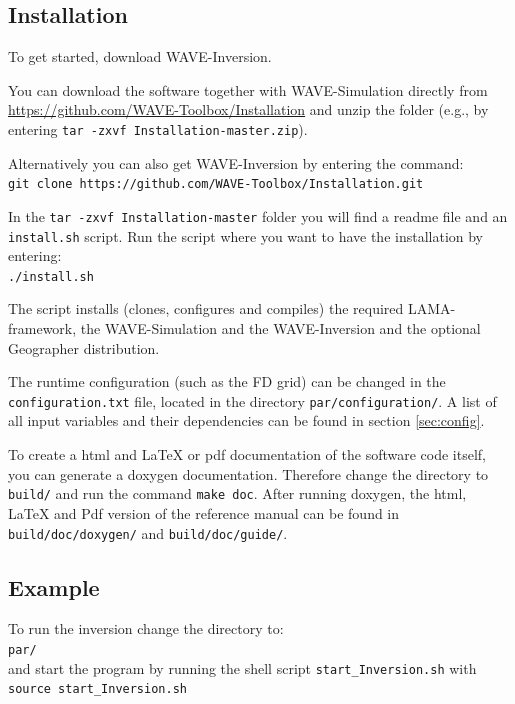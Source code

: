 \documentclass[pdftex,a4paper,parskip,listof=totoc,bibliography=totoc,onehalfspacing,12pt]{scrreprt}
\newcommand{\shellcmd}[1]{\indent\indent\texttt{#1}}	%
\newcommand{\shellcmdline}[1]{\indent\indent\texttt{\quad#1}} 	%
\begin{document}

\subsection{Installation}
To get started, download WAVE-Inversion. 

You can download the software together with WAVE-Simulation directly from \url{https://github.com/WAVE-Toolbox/Installation} and unzip the folder (e.g., by entering \shellcmd{tar -zxvf Installation-master.zip}).

Alternatively you can also get WAVE-Inversion by entering the command: \\\shellcmdline{git clone https://github.com/WAVE-Toolbox/Installation.git}

In the \shellcmd{tar -zxvf Installation-master} folder you will find a readme file and an \shellcmd{install.sh} script. Run the script where you want to have the installation by entering: \\\shellcmdline{./install.sh}

The script installs (clones, configures and compiles) the required LAMA-framework, the WAVE-Simulation and the WAVE-Inversion and the optional Geographer distribution.

The runtime configuration (such as the FD grid) can be changed in the \shellcmd{configuration.txt} file, located in the directory \shellcmd{par/configuration/}. A list of all input variables and their dependencies can be found in section \ref{sec:config}. 

To create a html and LaTeX or pdf documentation of the software code itself, you can generate a doxygen documentation. Therefore change the directory to \shellcmd{build/} and run the command \shellcmd{make doc}. After running doxygen, the html, LaTeX and Pdf version of the reference manual can be found in \shellcmd{build/doc/doxygen/} and \shellcmd{build/doc/guide/}.

\subsection{Example}
To run the inversion change the directory to: \\\shellcmdline{par/}\\
and start the program by running the shell script \shellcmd{start\_Inversion.sh} with  \\\shellcmdline{source start\_Inversion.sh}
\end{document}
